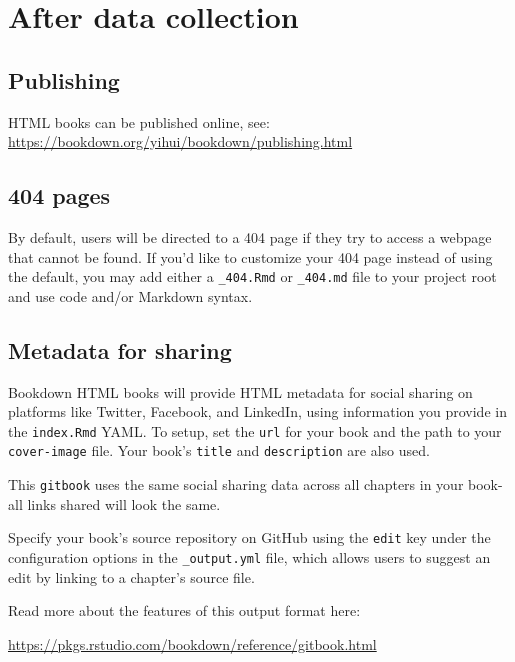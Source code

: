 \documentclass[
]{book}
\theoremstyle{definition}
\theoremstyle{definition}
\theoremstyle{definition}
\theoremstyle{definition}
\theoremstyle{remark}
\begin{document}
\hypertarget{after-data-collection}{%
\chapter{After data collection}\label{after-data-collection}}

\hypertarget{publishing}{%
\section{Publishing}\label{publishing}}

HTML books can be published online, see: \url{https://bookdown.org/yihui/bookdown/publishing.html}

\hypertarget{pages}{%
\section{404 pages}\label{pages}}

By default, users will be directed to a 404 page if they try to access a webpage that cannot be found. If you'd like to customize your 404 page instead of using the default, you may add either a \texttt{\_404.Rmd} or \texttt{\_404.md} file to your project root and use code and/or Markdown syntax.

\hypertarget{metadata-for-sharing}{%
\section{Metadata for sharing}\label{metadata-for-sharing}}

Bookdown HTML books will provide HTML metadata for social sharing on platforms like Twitter, Facebook, and LinkedIn, using information you provide in the \texttt{index.Rmd} YAML. To setup, set the \texttt{url} for your book and the path to your \texttt{cover-image} file. Your book's \texttt{title} and \texttt{description} are also used.

This \texttt{gitbook} uses the same social sharing data across all chapters in your book- all links shared will look the same.

Specify your book's source repository on GitHub using the \texttt{edit} key under the configuration options in the \texttt{\_output.yml} file, which allows users to suggest an edit by linking to a chapter's source file.

Read more about the features of this output format here:

\url{https://pkgs.rstudio.com/bookdown/reference/gitbook.html}
\end{document}
